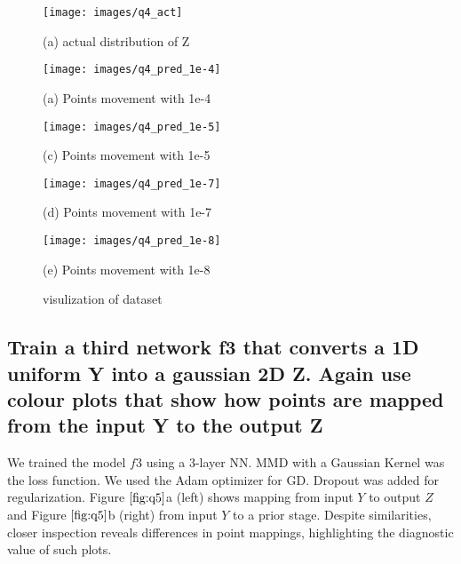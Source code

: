 \documentclass{article}
\begin{document}
\begin{figure}[htb]
  \begin{minipage}[b]{1.0\linewidth}
    \centering
    \centerline{\texttt{[image: images/q4\_act]}}
   \centerline{(a) actual distribution of Z }\medskip
  \end{minipage}
  \begin{minipage}[b]{.48\linewidth}
    \centering
    \centerline{\texttt{[image: images/q4\_pred\_1e-4]}}
    \centerline{(a) Points movement with 1e-4}\medskip
  \end{minipage}
  \hfill
  \begin{minipage}[b]{0.48\linewidth}
    \centering
    \centerline{\texttt{[image: images/q4\_pred\_1e-5]}}
    \centerline{(c) Points movement with 1e-5}\medskip
  \end{minipage}
  \begin{minipage}[b]{.48\linewidth}
    \centering
    \centerline{\texttt{[image: images/q4\_pred\_1e-7]}}
    \centerline{(d) Points movement with 1e-7}\medskip
  \end{minipage}
  \hfill
  \begin{minipage}[b]{0.48\linewidth}
    \centering
    \centerline{\texttt{[image: images/q4\_pred\_1e-8]}}
    \centerline{(e) Points movement with 1e-8}\medskip
  \end{minipage}
  \caption{visulization of dataset}
  \label{fig:q4}
  \end{figure}

\subsection{Train a third network f3 that converts a 1D uniform Y
into a gaussian 2D Z. 
Again use colour plots that show how points are mapped from
the input Y to the output Z}
\label{ssec:q5}

We trained the model $f3$ using a 3-layer NN. 
MMD with a Gaussian Kernel was the loss function. 
We used the Adam optimizer for GD. 
Dropout was added for regularization. 
Figure $\ref{fig:q5}$a (left) shows mapping from input $Y$ to output $Z$ 
and Figure $\ref{fig:q5}$b (right) from input $Y$ to a prior stage. 
Despite similarities, closer inspection reveals differences in 
point mappings, highlighting the diagnostic value of such plots.
\end{document}
